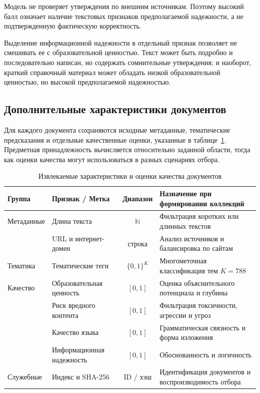 \documentclass[12pt,a4paper]{article}
\begin{document}
Модель не проверяет утверждения по внешним источникам.
Поэтому высокий балл означает наличие текстовых признаков предполагаемой надежности,
а не подтвержденную фактическую корректность.

Выделение информационной надежности в отдельный признак позволяет не смешивать
ее с образовательной ценностью. Текст может быть подробно и последовательно
написан, но содержать сомнительные утверждения; и наоборот, краткий справочный
материал может обладать низкой образовательной ценностью, но высокой
предполагаемой надежностью.

\subsection{Дополнительные характеристики документов}

Для каждого документа сохраняются исходные метаданные, тематические предсказания
и отдельные качественные оценки, указанные в таблице~\ref{tab:document-features}.
Предметная принадлежность вычисляется относительно заданной области,
тогда как оценки качества могут использоваться в разных сценариях отбора.


\begin{table}[ht]
\centering
\small
\caption{Извлекаемые характеристики и оценки качества документов}
\label{tab:document-features}
\begin{tabular}{@{}llcp{}@{}}
\toprule
Группа & Признак / Метка & Диапазон & Назначение при формировании коллекций \\
\midrule
Метаданные & Длина текста & $\mathbb{N}$ & Фильтрация коротких или длинных текстов \\
& URL и интернет-домен & строка & Анализ источников и балансировка по сайтам \\
\addlinespace
Тематика & Тематические теги & $\{0, 1\}^K$ & Многометочная классификация тем $K=788$\\
\addlinespace
Качество & Образовательная ценность & $[0, 1]$ & Оценка объяснительного потенциала и глубины \\
& Риск вредного контента & $[0, 1]$ & Фильтрация токсичности, агрессии и угроз \\
& Качество языка & $[0, 1]$ & Грамматическая связность и форма изложения \\
& Информационная надежность & $[0, 1]$ & Обоснованность и логичность \\
\addlinespace
Служебные & Индекс и SHA-256 & ID / хэш & Идентификация документов и воспроизводимость отбора \\
\bottomrule
\end{tabular}
\end{table}
\end{document}
